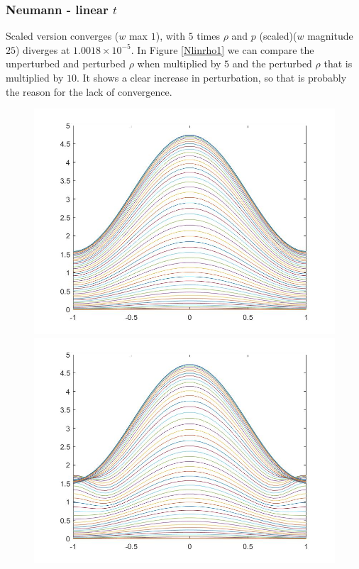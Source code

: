 \documentclass[11pt, a4paper]{article}
\theoremstyle{definition}
\begin{document}
\subsubsection{Neumann - linear $t$}
Scaled version converges ($w$ max $1$), with $5$ times $\rho$ and $p$ (scaled)($w$ magnitude $25$) diverges at $1.0018 \times 10^{-5}$. In Figure \ref{Nlinrho1} we can compare the unperturbed and perturbed $\rho$ when multiplied by $5$ and the perturbed $\rho$ that is multiplied by $10$. It shows a clear increase in perturbation, so that is probably the reason for the lack of convergence.
\begin{figure}[h]
	\includegraphics[scale=0.3]{Nlinrho1.jpg}
	\includegraphics[scale=0.3]{Nlinrho2.jpg}

\end{figure}
\end{document}
